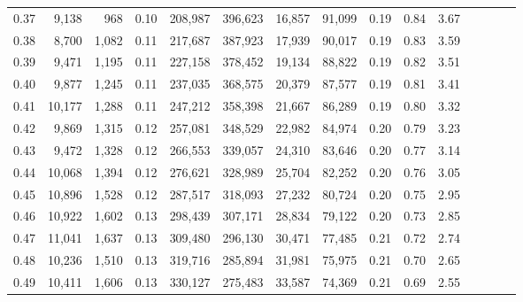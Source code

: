 \begin{tabular}{rrrcrrrrrrrrrrr}
0.37 &   9,138 &    968 &                                       0.10 &  208,987 &  396,623 &   16,857 &   91,099 &  0.19 &  0.84 &                         3.67 \\
0.38 &   8,700 &  1,082 &                                       0.11 &  217,687 &  387,923 &   17,939 &   90,017 &  0.19 &  0.83 &                         3.59 \\
0.39 &   9,471 &  1,195 &                                       0.11 &  227,158 &  378,452 &   19,134 &   88,822 &  0.19 &  0.82 &                         3.51 \\
0.40 &   9,877 &  1,245 &                                       0.11 &  237,035 &  368,575 &   20,379 &   87,577 &  0.19 &  0.81 &                         3.41 \\
0.41 &  10,177 &  1,288 &                                       0.11 &  247,212 &  358,398 &   21,667 &   86,289 &  0.19 &  0.80 &                         3.32 \\
0.42 &   9,869 &  1,315 &                                       0.12 &  257,081 &  348,529 &   22,982 &   84,974 &  0.20 &  0.79 &                         3.23 \\
0.43 &   9,472 &  1,328 &                                       0.12 &  266,553 &  339,057 &   24,310 &   83,646 &  0.20 &  0.77 &                         3.14 \\
0.44 &  10,068 &  1,394 &                                       0.12 &  276,621 &  328,989 &   25,704 &   82,252 &  0.20 &  0.76 &                         3.05 \\
0.45 &  10,896 &  1,528 &                                       0.12 &  287,517 &  318,093 &   27,232 &   80,724 &  0.20 &  0.75 &                         2.95 \\
0.46 &  10,922 &  1,602 &                                       0.13 &  298,439 &  307,171 &   28,834 &   79,122 &  0.20 &  0.73 &                         2.85 \\
0.47 &  11,041 &  1,637 &                                       0.13 &  309,480 &  296,130 &   30,471 &   77,485 &  0.21 &  0.72 &                         2.74 \\
0.48 &  10,236 &  1,510 &                                       0.13 &  319,716 &  285,894 &   31,981 &   75,975 &  0.21 &  0.70 &                         2.65 \\
0.49 &  10,411 &  1,606 &                                       0.13 &  330,127 &  275,483 &   33,587 &   74,369 &  0.21 &  0.69 &                         2.55 \\

\end{tabular}
